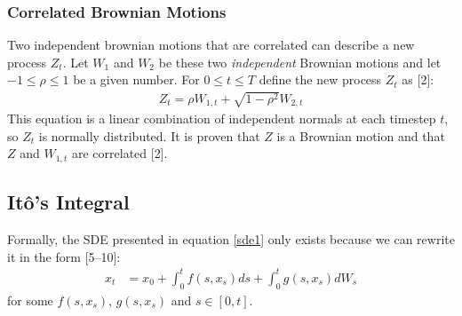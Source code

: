 \documentclass[12pt,twoside]{reedthesis}
\theoremstyle{definition}
\theoremstyle{definition}
\theoremstyle{remark}
\begin{document}
  \subsubsection{Correlated Brownian Motions}\label{corr}
  
  Two independent brownian motions that are correlated can describe a new
  process \(Z_t\). Let \(W_1\) and \(W_2\) be these two \emph{independent}
  Brownian motions and let \(-1 \leq \rho \leq 1\) be a given number. For
  \(0 \leq t \leq T\) define the new process \(Z_t\) as {[}2{]}:
  \begin{align}
  \label{eq:corr_brow}
  Z_t = \rho W_{1,t} + \sqrt{1-\rho^2}W_{2,t}
  \end{align}
  \noindent
  This equation is a linear combination of independent normals at each
  timestep \(t\), so \(Z_t\) is normally distributed. It is proven that
  \(Z\) is a Brownian motion and that \(Z\) and \(W_{1,t}\) are correlated
  {[}2{]}.
  
  \subsection{Itô's Integral}\label{itos-integral}
  
  Formally, the SDE presented in equation \ref{sde1} only exists because
  we can rewrite it in the form {[}5--10{]}:
  \begin{align} \label{sde1}
  x_t &= x_0 + \int_{0}^{t}{f(s, x_s)ds} + \int_{0}^{t}{g(s, x_s)dW_s}
  \end{align}
  \noindent
  for some \(f(s, x_s)\), \(g(s, x_s)\) and \(s \in [0,t]\).
  
\end{document}
